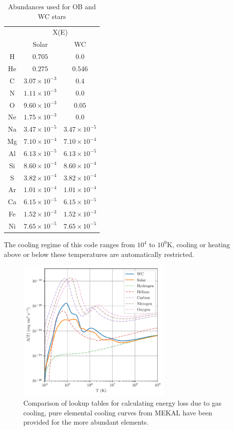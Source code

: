 \begin{table}[ht]
  \centering
  \begin{tabular}{@{}ccc@{}}
  \toprule
  \multicolumn{1}{l}{} & \multicolumn{2}{c}{X(E)} \\ \cmidrule(l){2-3} 
   & Solar & WC \\ \midrule
  H & $0.705$ & $0.0$ \\
  He & $0.275$ & $0.546$ \\
  C & $3.07 \times 10^{-3}$ & $0.4$ \\
  N & $1.11 \times 10^{-3}$ & $0.0$ \\
  O & $9.60 \times 10^{-3}$ & $0.05$ \\
  Ne & $1.75 \times 10^{-3}$ & $0.0$ \\
  Na & $3.47 \times 10^{-5}$ & $3.47 \times 10^{-5}$ \\
  Mg & $7.10 \times 10^{-4}$ & $7.10 \times 10^{-4}$ \\
  Al & $6.13 \times 10^{-5}$ & $6.13 \times 10^{-5}$ \\
  Si & $8.60 \times 10^{-4}$ & $8.60 \times 10^{-4}$ \\
  S & $3.82 \times 10^{-4}$ & $3.82 \times 10^{-4}$ \\
  Ar & $1.01 \times 10^{-4}$ & $1.01 \times 10^{-4}$ \\
  Ca & $6.15 \times 10^{-5}$ & $6.15 \times 10^{-5}$ \\
  Fe & $1.52 \times 10^{-3}$ & $1.52 \times 10^{-3}$ \\
  Ni & $7.65 \times 10^{-5}$ & $7.65 \times 10^{-5}$ \\ \bottomrule
  \end{tabular}
  \caption{Abundances used for OB and WC stars}
  \label{tab:abundances}
\end{table}

The cooling regime of this code ranges from $10^4$ to $10^9 \si{\kelvin}$, cooling or heating above or below these temperatures are automatically restricted.

\begin{figure}[ht]
  \centering
  \includegraphics[width=3in]{assets/cooling_curves.pdf}
  \caption[WR and OB $\Lambda(T)$ cooling curves]{Comparison of lookup tables for calculating energy loss due to gas cooling, pure elemental cooling curves from MEKAL have been provided for the more abundant elements.}
  \label{fig:cooling-curve}
\end{figure}

